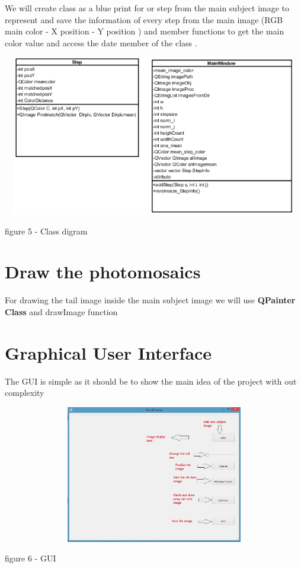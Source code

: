 \documentclass[a4paper,12pt]{report}
\begin{document}
 We will create class as a blue print for or step from the main subject image to represent and save the information of every step from the main image (RGB main color - X position - Y position ) and member functions to get the main color value and access the date member of the class .
 
 \begin{center}
 		\includegraphics[width=15cm, height=7cm, 
 	keepaspectratio]{Class} 
 	
 	{figure 5 - Class digram}\\
 \end{center}
 
 
 \section{Draw the photomosaics}
 
 For drawing the tail image inside the main subject image we will use \textbf{QPainter Class}\cite{6} and drawImage function 
 
 
 \section{Graphical User Interface }
 
 The GUI is simple as it should be to show the main idea of the project with out complexity 
 
 \begin{center}
 		\includegraphics[width=14cm, height=6cm, 
 	keepaspectratio]{mainwindow} 
 	
 	{figure 6 - GUI}\\
 	
 \end{center}
 
\end{document}
